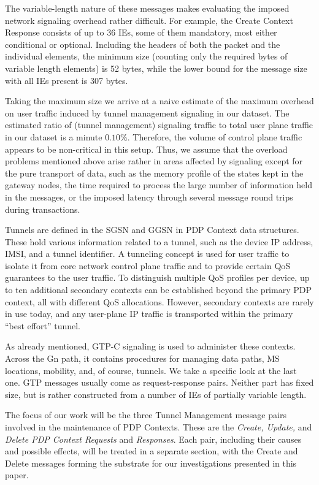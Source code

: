The variable-length nature of these messages makes evaluating the imposed network signaling overhead rather difficult. For example, the Create Context Response consists of up to 36 \glspl{IE}, some of them mandatory, most either conditional or optional. Including the headers of both the packet and the individual elements, the minimum size (counting only the required bytes of variable length elements) is 52 bytes, while the lower bound for the message size with all \glspl{IE} present is 307 bytes.

Taking the maximum size we arrive at a naive estimate of the maximum overhead on user traffic induced by tunnel management signaling in our dataset. The estimated ratio of (tunnel management) signaling traffic to total user plane traffic in our dataset is a minute $0.10\%$. Therefore, the volume of control plane traffic appears to be non-critical in this setup. Thus, we assume that the overload problems mentioned above arise rather in areas affected by signaling except for the pure transport of data, such as the memory profile of the states kept in the gateway nodes, the time required to process the large number of information held in the messages, or the imposed latency through several message round trips during transactions.


Tunnels are defined in the \gls{SGSN} and \gls{GGSN} in \gls{PDP} Context data structures. These hold various information related to a tunnel, such as the device IP address, \gls{IMSI}, and a tunnel identifier. A tunneling concept is used for user traffic to isolate it from core network control plane traffic and to provide certain \gls{QoS} guarantees to the user traffic. To distinguish multiple \gls{QoS} profiles per device, up to ten additional secondary contexts can be established beyond the primary PDP context, all with different \gls{QoS} allocations. However, secondary contexts are rarely in use today, and any user-plane IP traffic is transported within the primary ``best effort'' tunnel.

As already mentioned, GTP-C signaling is used to administer these contexts. Across the Gn path, it contains procedures for managing data paths, \gls{MS} locations, mobility, and, of course, tunnels. We take a specific look at the last one. \gls{GTP} messages usually come as request-response pairs. Neither part has fixed size, but is rather constructed from a number of \glspl{IE} of partially variable length. 

The focus of our work will be the three Tunnel Management message pairs involved in the maintenance of PDP Contexts. These are the \textit{Create, Update,} and \textit{Delete PDP Context Requests} and \textit{Responses}. Each pair, including their causes and possible effects, will be treated in a separate section, with the Create and Delete messages forming the substrate for our investigations presented in this paper.

